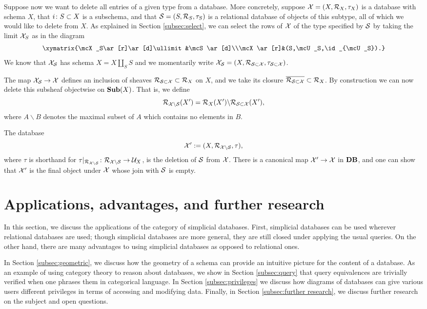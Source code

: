 \documentclass{amsart}
\begin{document}
Suppose now we want to delete all entries of a given type from a database.  More concretely, suppose $\mathcal{X}=(X,\mathcal{R}_X,\tau_X)$ is a database with schema $X$, that $i\colon S\subset X$ is a subschema, and that $\mathcal{S}=(S,\mathcal{R}_S,\tau_S)$ is a relational database of objects of this subtype, all of which we would like to delete from $X$.  As explained in Section \ref{subsec:select}, we can select the rows of $\mathcal{X}$ of the type specified by $\mathcal{S}$ by taking the limit $\mathcal{X}_S$ as in the diagram $$\xymatrix{\mcX_S\ar[r]\ar[d]\ullimit&\mcS\ar[d]\\\mcX\ar[r]&(S,\mcU_S,\id_{\mcU_S}).}$$  We know that $\mathcal{X}_\mathcal{S}$ has schema $X=X\amalg_SS$ and we momentarily write $\mathcal{X}_\mathcal{S}=(X,\mathcal{R}_{\mathcal{S}\subset\mathcal{X}},\tau_{\mathcal{S}\subset\mathcal{X}})$.  

The map $\mathcal{X}_\mathcal{S}\rightarrow\mathcal{X}$ defines an inclusion of sheaves $\mathcal{R}_{\mathcal{S}\subset\mathcal{X}}\subset\mathcal{R}_X$ on $X$, and we take its closure $\overline{\mathcal{R}_{\mathcal{S}\subset\mathcal{X}}}\subset\mathcal{R}_X$.  By construction we can now delete this subsheaf objectwise on ${\bf Sub}(X)$.  That is, we define $$\mathcal{R}_{\mathcal{X}\backslash\mathcal{S}}(X')=\mathcal{R}_X(X')\backslash\mathcal{R}_{\mathcal{S}\subset\mathcal{X}}(X'),$$ where $A\backslash B$ denotes the maximal subset of $A$ which contains no elements in $B$.

The database $$\mathcal{X}':=(X,\mathcal{R}_{\mathcal{X}\backslash\mathcal{S}},\tau),$$ where $\tau$ is shorthand for $\tau|_{\mathcal{R}_{\mathcal{X}\backslash\mathcal{S}}}\colon\mathcal{R}_{\mathcal{X}\backslash\mathcal{S}}\rightarrow\mathcal{U}_X$, is the deletion of $\mathcal{S}$ from $\mathcal{X}$.  There is a canonical map $\mathcal{X}'\rightarrow\mathcal{X}$ in ${\bf DB}$, and one can show that $\mathcal{X}'$ is the final object under $\mathcal{X}$ whose join with $\mathcal{S}$ is empty.

\section{Applications, advantages, and further research}\label{sec:applications}

In this section, we discuss the applications of the category of simplicial databases.  First, simplicial databases can be used wherever relational databases are used; though simplicial databases are more general, they are still closed under applying the usual queries.  On the other hand, there are many advantages to using simplicial databases as opposed to relational ones.  

In Section \ref{subsec:geometric}, we discuss how the geometry of a schema can provide an intuitive picture for the content of a database.  As an example of using category theory to reason about databases, we show in Section \ref{subsec:query} that query equivalences are trivially verified when one phrases them in categorical language.  In Section \ref{subsec:privileges} we discuss how diagrams of databases can give various users different privileges in terms of accessing and modifying data.  Finally, in Section \ref{subsec:further research}, we discuss further research on the subject and open questions.
\end{document}
